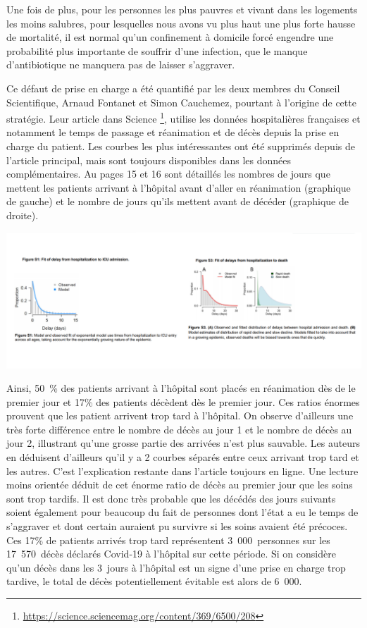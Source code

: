 \documentclass[
]{article}
\begin{document}
Une fois de plus, pour les personnes les plus pauvres et vivant dans les
logements les moins salubres, pour lesquelles nous avons vu plus haut
une plus forte hausse de mortalité, il est normal qu'un confinement à
domicile forcé engendre une probabilité plus importante de souffrir
d'une infection, que le manque d'antibiotique ne manquera pas de laisser
s'aggraver.

Ce défaut de prise en charge a été quantifié par les deux membres du
Conseil Scientifique, Arnaud Fontanet et Simon Cauchemez, pourtant à
l'origine de cette stratégie. Leur article dans Science \footnote{\url{https://science.sciencemag.org/content/369/6500/208}},
utilise les données hospitalières françaises et notamment le temps de
passage et réanimation et de décès depuis la prise en charge du patient.
Les courbes les plus intéressantes ont été supprimés depuis de l'article
principal, mais sont toujours disponibles dans les données
complémentaires. Au pages 15 et 16 sont détaillés les nombres de jours
que mettent les patients arrivant à l'hôpital avant d'aller en
réanimation (graphique de gauche) et le nombre de jours qu'ils mettent
avant de décéder (graphique de droite).

\includegraphics[width=10.41667in,height=\textheight]{data/images/fontanet.png}

Ainsi, 50~\% des patients arrivant à l'hôpital sont placés en
réanimation dès de le premier jour et 17\% des patients décèdent dès le
premier jour. Ces ratios énormes prouvent que les patient arrivent trop
tard à l'hôpital. On observe d'ailleurs une très forte différence entre
le nombre de décès au jour 1 et le nombre de décès au jour 2, illustrant
qu'une grosse partie des arrivées n'est plus sauvable. Les auteurs en
déduisent d'ailleurs qu'il y a 2 courbes séparés entre ceux arrivant
trop tard et les autres. C'est l'explication restante dans l'article
toujours en ligne. Une lecture moins orientée déduit de cet énorme ratio
de décès au premier jour que les soins sont trop tardifs. Il est donc
très probable que les décédés des jours suivants soient également pour
beaucoup du fait de personnes dont l'état a eu le temps de s'aggraver et
dont certain auraient pu survivre si les soins avaient été précoces. Ces
17\% de patients arrivés trop tard représentent 3~000~personnes sur les
17~570~décès déclarés Covid-19 à l'hôpital sur cette période. Si on
considère qu'un décès dans les 3~jours à l'hôpital est un signe d'une
prise en charge trop tardive, le total de décès potentiellement évitable
est alors de 6~000.
\end{document}
